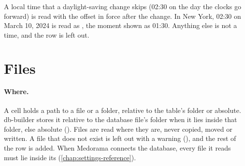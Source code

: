 A local time that a daylight-saving change skips (02:30 on the day the clocks go forward) is read
with the offset in force after the change. In New York, 02:30 on March 10, 2024 is read as
, the moment shown as 01:30. Anything else is not a time, and the
row is left out.

\section{Files}
\label{sec:importing-files}

\paragraph{Where.} A  cell holds a path to a file or a folder, relative to the table's
folder or absolute. db-builder stores it relative to the database file's folder when it lies
inside that folder, else absolute (). Files are read where they are, never
copied, moved or written. A file that does not exist is left out with a warning (), and the rest of the row is added. When Medorama connects the database, every file it
reads must lie inside its  (\cref{chap:settings-reference}).

